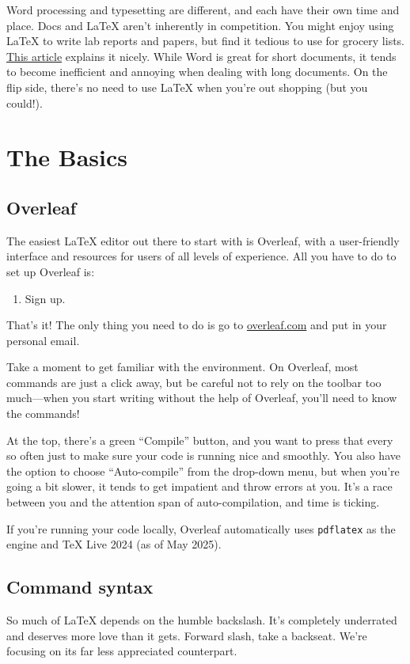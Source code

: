 \documentclass[letterpaper, 12pt]{article}
\begin{document}
Word processing and typesetting are different, and each have their own time and place. Docs and \LaTeX{} aren't inherently in competition. You might enjoy using \LaTeX{} to write lab reports and papers, but find it tedious to use for grocery lists. \href{https://programmingforresearch.wordpress.com/2012/03/23/word-processor-versus-typesetter-2/}{This article} explains it nicely. While Word is great for short documents, it tends to become inefficient and annoying when dealing with long documents. On the flip side, there's no need to use \LaTeX{} when you're out shopping (but you could!).

\newpage

\section{The Basics}

\subsection{Overleaf}
The easiest \LaTeX{} editor out there to start with is Overleaf, with a user-friendly interface and resources for users of all levels of experience. All you have to do to set up Overleaf is:

\begin{enumerate}
    \item Sign up.
\end{enumerate}

That's it! The only thing you need to do is go to \href{overleaf.com}{overleaf.com} and put in your personal email.

Take a moment to get familiar with the environment. On Overleaf, most commands are just a click away, but be careful not to rely on the toolbar too much---when you start writing without the help of Overleaf, you'll need to know the commands!

At the top, there's a green ``Compile'' button, and you want to press that every so often just to make sure your code is running nice and smoothly. You also have the option to choose ``Auto-compile'' from the drop-down menu, but when you're going a bit slower, it tends to get impatient and throw errors at you. It's a race between you and the attention span of auto-compilation, and time is ticking.

If you're running your code locally, Overleaf automatically uses \texttt{pdflatex} as the engine and \TeX{} Live 2024 (as of May 2025). 

\subsection{Command syntax}
So much of \LaTeX{} depends on the humble backslash. It's completely underrated and deserves more love than it gets. Forward slash, take a backseat. We're focusing on its far less appreciated counterpart.
\end{document}
